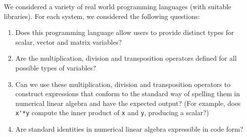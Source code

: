We considered a variety of real world programming languages (with
suitable libraries). For each system, we considered the following
questions:
\begin{enumerate}
\item Does this programming language allow users to provide distinct types
for scalar, vector and matrix variables?
\item Are the multiplication, division and transposition operators defined
for all possible types of variables?
\item Can we use these multiplication, division and transposition operators
to construct expressions that conform to the standard way of spelling
them in numerical linear algebra and have the expected output? (For
example, does \verb`x'*y` compute the inner product of \verb`x`
and \verb`y`, producing a scalar?)
\item Are standard identities in numerical linear algebra expressible in
code form?
\end{enumerate}
